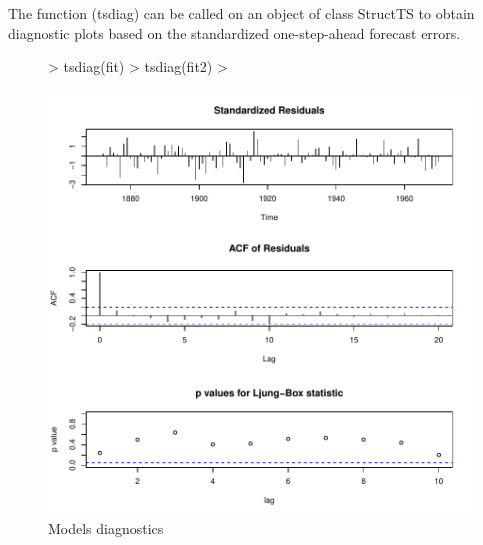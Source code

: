 \documentclass[10pt, a4paper]{article} %
\begin{document}
\noindent The function (tsdiag) can be called on an object of class StructTS to obtain diagnostic plots based on the standardized one-step-ahead forecast errors.
\begin{figure}[H]
\centering
\begin{Schunk}
\begin{Sinput}
> tsdiag(fit)
> tsdiag(fit2)
> 
\end{Sinput}
\end{Schunk}
\includegraphics{FINAL_VERSION-103}
\caption{Models diagnostics}
\end{figure}
\end{document}
